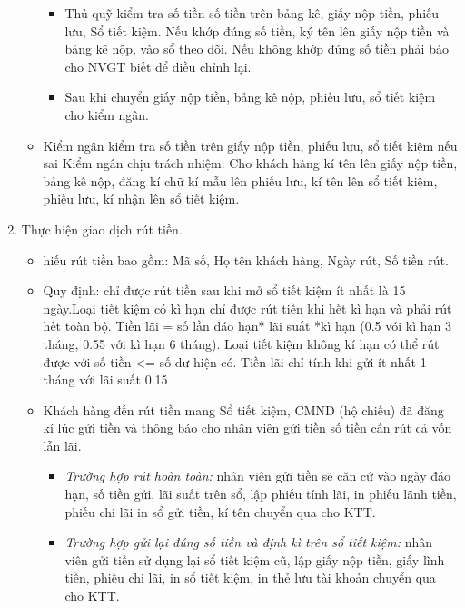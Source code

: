 \documentclass{article}
\begin{document}
\begin{enumerate}
\begin{itemize}
\begin{itemize}
						\item Thủ quỹ kiểm tra số tiền số tiền trên bảng kê, giấy nộp tiền, phiếu lưu, Sổ tiết kiệm. Nếu khớp đúng số tiền, ký tên lên giấy nộp tiền và bảng kê nộp, vào sổ theo dõi. Nếu không khớp đúng số tiền phải báo cho NVGT biết để điều chỉnh lại.
						
						\item Sau khi chuyển giấy nộp tiền, bảng kê nộp, phiếu lưu, sổ tiết kiệm cho kiểm ngân.
					\end{itemize}
					
				\item Kiểm ngân kiểm tra số tiền trên giấy nộp tiền, phiếu lưu, sổ tiết kiệm nếu sai Kiểm ngân chịu trách nhiệm. Cho khách hàng kí tên lên giấy nộp tiền, bảng kê nộp, đăng kí chữ kí mẫu lên phiếu lưu, kí tên lên sổ tiết kiệm, phiếu lưu, kí nhận lên sổ tiết kiệm.
				
			\end{itemize}
			
			\newpage
			\item Thực hiện giao dịch rút tiền.
			
				\begin{itemize}
					\item hiếu rút tiền bao gồm: Mã số, Họ tên khách hàng, Ngày rút, Số tiền rút.
					
					\item Quy định: chỉ được rút tiền sau khi mở sổ tiết kiệm ít nhất là 15 ngày.Loại tiết kiệm có kì hạn chỉ được rút tiền khi hết kì hạn và phải rút hết toàn bộ. Tiền lãi = số lần đáo hạn* lãi suất *kì hạn (0.5 vói kì hạn 3 tháng, 0.55 với kì hạn 6 tháng). Loại tiết kiệm không kí hạn có thể rút được với số tiền <= số dư hiện có. Tiền lãi chỉ tính khi gửi ít nhất 1 tháng với lãi suất 0.15%
					
					\item Khách hàng đến rút tiền mang Sổ tiết kiệm, CMND (hộ chiếu) đã đăng kí lúc gửi tiền và thông báo cho nhân viên gửi tiền số tiền cấn rút cả vốn lẫn lãi.
					
						\begin{itemize}
							\item \textit{Trường hợp rút hoàn toàn:} nhân viên gửi tiền sẽ căn cứ vào ngày đáo hạn, số tiền gửi, lãi suất trên sổ, lập phiếu tính lãi, in phiếu lãnh tiền, phiếu chi lãi in sổ gửi tiền, kí tên chuyển qua cho KTT.
							
							\item \textit{Trường hợp gửi lại đúng số tiền và định kì trên sổ tiết kiệm:} nhân viên gửi tiền sử dụng lại sổ tiết kiệm cũ, lập giấy nộp tiền, giấy lĩnh tiền, phiếu chi lãi, in sổ tiết kiệm, in thẻ lưu tài khoản chuyển qua cho KTT.
							

\end{itemize}
\end{itemize}
\end{enumerate}
\end{document}
